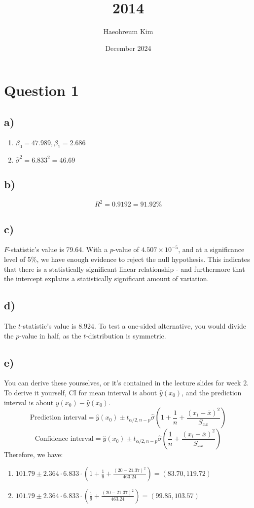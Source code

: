 \documentclass{article}
\title{2014}
\author{Haeohreum Kim}
\date{December 2024}
\begin{document}
\maketitle
\section*{Question 1}
\subsection*{a)}
\begin{enumerate}
    \item $\beta_0 = 47.989, \beta_1 = 2.686$
    \item $\hat{\sigma}^2 = 6.833^2 = 46.69$
\end{enumerate}

\subsection*{b)}
$$ R^2 = 0.9192 = 91.92\%$$
\subsection*{c)}
$F$-statistic's value is 79.64. With a $p$-value of $4.507 \times 10^{-5}$, and at a significance level
of 5\%, we have enough evidence to reject the null hypothesis. This indicates that there is a statistically significant
linear relationship - and furthermore that the intercept explains a statistically significant amount of 
variation.

\subsection*{d)}
The $t$-statistic's value is $8.924$. To test a one-sided alternative, you would divide the $p$-value 
in half, as the $t$-distribution is symmetric. 

\subsection*{e)}
You can derive these yourselves, or it's contained in the lecture slides for week 2. To derive it yourself, CI for mean interval is about 
$\hat{y}(x_0)$, and the prediction interval is about $y(x_0) - \hat{y}(x_0)$.
$$ \text{Prediction interval} = \hat{y}(x_0) \pm t_{\alpha/2, n-p} \hat{\sigma}\left(1 + \frac{1}{n} + \frac{(x_i - \bar{x})^2}{S_{xx}}\right)$$
$$ \text{Confidence interval} = \hat{y}(x_0) \pm t_{\alpha/2, n-p} \hat{\sigma}\left(\frac{1}{n} + \frac{(x_i - \bar{x})^2}{S_{xx}}\right)$$
Therefore, we have:
\begin{enumerate}
    \item $101.79 \pm 2.364 \cdot 6.833 \cdot \left(1 + \frac{1}{9} + \frac{(20 - 21.37)^2}{463.24}\right) = (83.70, 119.72)$
    \item $101.79 \pm 2.364 \cdot 6.833 \cdot \left(\frac{1}{9} + \frac{(20 - 21.37)^2}{463.24}\right) = (99.85,103.57)$
\end{enumerate}
\newpage 
\end{document}
